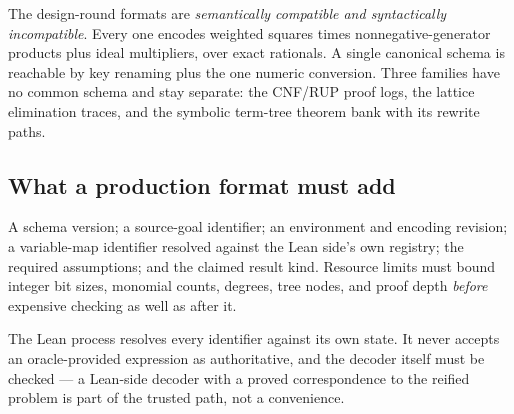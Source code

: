 The design-round formats are \emph{semantically compatible and syntactically
incompatible}.
Every one encodes weighted squares times nonnegative-generator products plus
ideal multipliers, over exact rationals. A single canonical schema is reachable
by key renaming plus the one  numeric conversion. Three families have no
common schema and stay separate: the CNF/RUP proof logs, the lattice elimination
traces, and the symbolic term-tree theorem bank with its rewrite paths.

\subsection{What a production format must add}

A schema version; a source-goal identifier; an environment and encoding
revision; a variable-map identifier resolved against the Lean side's own
registry; the required assumptions; and the claimed result kind. Resource limits
must bound integer bit sizes, monomial counts, degrees, tree nodes, and proof
depth \emph{before} expensive checking as well as after it.

The Lean process resolves every identifier against its own state. It never
accepts an oracle-provided expression as authoritative, and the decoder itself
must be checked --- a Lean-side decoder with a proved correspondence to the
reified problem is part of the trusted path, not a convenience.
